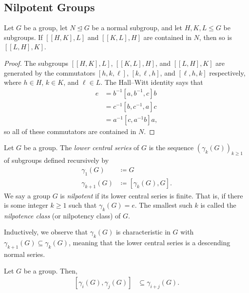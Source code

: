 \documentclass[10pt]{mypackage}
\renewcommand{\coloneq}{\coloneqq}
\begin{document}
\subsection{Nilpotent Groups}%
\begin{lemma}
  Let $G$ be a group, let $N\trianglelefteq G$ be a normal subgroup, and let $H,K,L\leq G$ be subgroups. If $\left[ \left[ H,K \right],L \right]$ and $ \left[ \left[ K,L \right],H \right] $ are contained in $N$, then so is $ \left[ \left[ L,H \right],K \right] $.
\end{lemma}
\begin{proof}
  The subgroups $ \left[ \left[ H,K \right],L \right] $, $ \left[ \left[ K,L \right],H \right] $, and $ \left[ \left[ L,H \right],K \right] $ are generated by the commutators $ \left[ h,k,\ell \right] $, $ \left[ k,\ell,h \right] $, and $ \left[ \ell,h,k \right] $ respectively, where $h\in H$, $k\in K$, and $\ell\in L$. The Hall--Witt identity says that
  \begin{align*}
    e &= b^{-1}\left[ a,b^{-1},c \right]b\\
      &=  c^{-1} \left[ b,c^{-1},a \right]c\\
      &= a^{-1} \left[ c,a^{-1}b \right]a,
  \end{align*}
  so all of these commutators are contained in $N$.
\end{proof}
\begin{definition}
  Let $G$ be a group. The \textit{lower central series} of $G$ is the sequence $ \left( \gamma_k(G) \right)_{k\geq 1} $ of subgroups defined recursively by
  \begin{align*}
    \gamma_1(G) &\coloneq G\\
    \gamma_{k+1}(G) &\coloneq \left[ \gamma_k(G),G \right].
  \end{align*}
  We say a group $G$ is \textit{nilpotent} if its lower central series is finite. That is, if there is some integer $k\geq 1$ such that $\gamma_k(G) = e$. The smallest such $k$ is called the \textit{nilpotence class} (or nilpotency class) of $G$.
\end{definition}
Inductively, we observe that $\gamma_k(G)$ is characteristic in $G$ with $\gamma_{k+1}(G)\subseteq \gamma_k(G)$, meaning that the lower central series is a descending normal series.
\begin{lemma}
  Let $G$ be a group. Then,
  \begin{align*}
    \left[ \gamma_i(G),\gamma_j(G) \right] &\subseteq \gamma_{i+j}(G).
  \end{align*}
\end{lemma}
\end{document}
